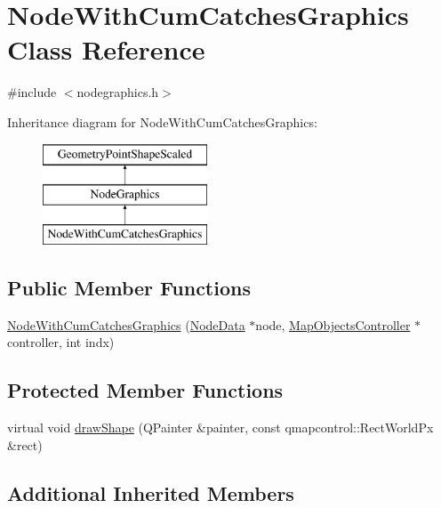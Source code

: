 \hypertarget{class_node_with_cum_catches_graphics}{}\section{Node\+With\+Cum\+Catches\+Graphics Class Reference}
\label{class_node_with_cum_catches_graphics}


{\ttfamily \#include $<$nodegraphics.\+h$>$}

Inheritance diagram for Node\+With\+Cum\+Catches\+Graphics\+:\begin{figure}[H]
\begin{center}
\leavevmode
\includegraphics[height=3.000000cm]{da/d13/class_node_with_cum_catches_graphics}
\end{center}
\end{figure}
\subsection*{Public Member Functions}
\begin{DoxyCompactItemize}
\item 
\mbox{\hyperlink{class_node_with_cum_catches_graphics_a6ac3177ea9f86a0a2120bade452247b6}{Node\+With\+Cum\+Catches\+Graphics}} (\mbox{\hyperlink{class_node_data}{Node\+Data}} $\ast$node, \mbox{\hyperlink{class_map_objects_controller}{Map\+Objects\+Controller}} $\ast$controller, int indx)
\end{DoxyCompactItemize}
\subsection*{Protected Member Functions}
\begin{DoxyCompactItemize}
\item 
virtual void \mbox{\hyperlink{class_node_with_cum_catches_graphics_ad96a95e9bf6028bc623f7321c639d933}{draw\+Shape}} (Q\+Painter \&painter, const qmapcontrol\+::\+Rect\+World\+Px \&rect)
\end{DoxyCompactItemize}
\subsection*{Additional Inherited Members}



